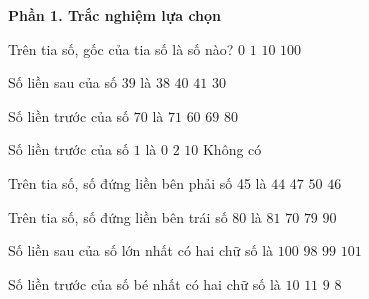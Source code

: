 \textbf{Phần 1. Trắc nghiệm lựa chọn}

\begin{ex} %
Trên tia số, gốc của tia số là số nào?
\choice
{\True $0$}
{$1$}
{$10$}
{$100$}
\end{ex}

\begin{ex} %
Số liền sau của số $39$ là
\choice
{$38$}
{\True $40$}
{$41$}
{$30$}
\end{ex}

\begin{ex} %
Số liền trước của số $70$ là
\choice
{$71$}
{$60$}
{\True $69$}
{$80$}
\end{ex}

\begin{ex} %
Số liền trước của số $1$ là
\choice
{\True $0$}
{$2$}
{$10$}
{Không có}
\end{ex}

\begin{ex} %
Trên tia số, số đứng liền bên phải số 45 là
\choice
{$44$}
{$47$}
{$50$}
{\True $46$}
\end{ex}

\begin{ex} %
Trên tia số, số đứng liền bên trái số 80 là
\choice
{$81$}
{$70$}
{\True $79$}
{$90$}
\end{ex}

\begin{ex} %
Số liền sau của số lớn nhất có hai chữ số là
\choice
{\True $100$}
{$98$}
{$99$}
{$101$}
\end{ex}

\begin{ex} %
Số liền trước của số bé nhất có hai chữ số là
\choice
{$10$}
{$11$}
{\True $9$}
{$8$}
\end{ex}

